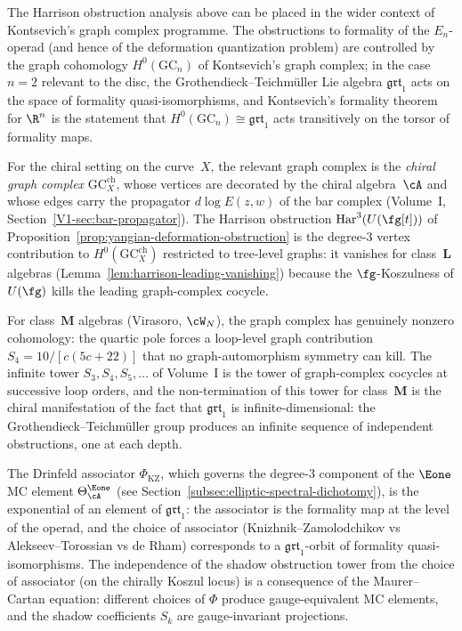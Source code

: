 \begin{remark}
\label{rem:grt-graph-complex-obstruction}
The Harrison obstruction analysis above can be placed in the
wider context of Kontsevich's graph complex programme. The
obstructions to formality of the $E_n$-operad (and hence of
the deformation quantization problem) are controlled by the
graph cohomology $H^0(\mathrm{GC}_n)$ of Kontsevich's graph
complex; in the case $n = 2$ relevant to the disc, the
Grothendieck--Teichm\"uller Lie algebra $\mathfrak{grt}_1$
acts on the space of formality quasi-isomorphisms, and
Kontsevich's formality theorem for $\R^n$ is the
statement that $H^0(\mathrm{GC}_n) \cong \mathfrak{grt}_1$
acts transitively on the torsor of formality maps.

For the chiral setting on the curve~$X$, the relevant graph
complex is the \emph{chiral graph complex}
$\mathrm{GC}_X^{\mathrm{ch}}$, whose vertices are decorated by
the chiral algebra~$\cA$ and whose edges carry the
propagator $d\log E(z,w)$ of the bar complex (Volume~I,
Section~\textup{\ref*{V1-sec:bar-propagator}}). The
Harrison obstruction
$\Har^3(U(\fg[t]))$ of
Proposition~\ref{prop:yangian-deformation-obstruction}
is the degree-$3$ vertex contribution to
$H^0(\mathrm{GC}_X^{\mathrm{ch}})$ restricted to tree-level
graphs: it vanishes for class~$\mathbf{L}$ algebras
(Lemma~\ref{lem:harrison-leading-vanishing}) because the
$\fg$-Koszulness of $U(\fg)$ kills the leading graph-complex
cocycle.

For class~$\mathbf{M}$ algebras (Virasoro, $\cW_N$), the
graph complex has genuinely nonzero cohomology: the quartic
pole forces a loop-level graph contribution
$S_4 = 10/[c(5c{+}22)]$ that no graph-automorphism
symmetry can kill. The infinite tower
$S_3, S_4, S_5, \ldots$ of
Volume~I is the tower of graph-complex cocycles at
successive loop orders, and the non-termination of this
tower for class~$\mathbf{M}$ is the chiral manifestation of the
fact that $\mathfrak{grt}_1$ is infinite-dimensional: the
Grothendieck--Teichm\"uller group produces an infinite
sequence of independent obstructions, one at each depth.

The Drinfeld associator $\Phi_{\mathrm{KZ}}$, which governs
the degree-$3$ component of the $\Eone$ MC element
$\Theta_\cA^{\Eone}$ (see
Section~\ref{subsec:elliptic-spectral-dichotomy}), is the
exponential of an element of $\mathfrak{grt}_1$: the
associator is the formality map at the level of the
operad, and the choice of associator (Knizhnik--Zamolodchikov
vs Alekseev--Torossian vs de Rham) corresponds to a
$\mathfrak{grt}_1$-orbit of formality quasi-isomorphisms.
The independence of the shadow obstruction tower from
the choice of associator (on the chirally Koszul locus) is a
consequence of the Maurer--Cartan equation: different choices
of $\Phi$ produce gauge-equivalent MC elements, and the
shadow coefficients $S_k$ are gauge-invariant projections.
\end{remark}

